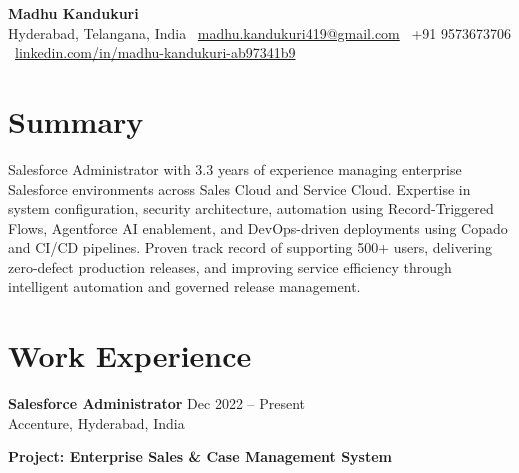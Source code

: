 \documentclass[11pt,a4paper]{article}
\begin{document}
\begin{center}
{\LARGE \textbf{Madhu Kandukuri}}\\[6pt]
Hyderabad, Telangana, India \textbar\ 
\href{mailto:madhu.kandukuri419@gmail.com}{madhu.kandukuri419@gmail.com} \textbar\ 
+91 9573673706 \textbar\ 
\href{https://www.linkedin.com/in/madhu-kandukuri-ab97341b9/}{linkedin.com/in/madhu-kandukuri-ab97341b9}
\end{center}

\section*{Summary}

Salesforce Administrator with 3.3 years of experience managing enterprise Salesforce environments across Sales Cloud and Service Cloud. Expertise in system configuration, security architecture, automation using Record-Triggered Flows, Agentforce AI enablement, and DevOps-driven deployments using Copado and CI/CD pipelines. Proven track record of supporting 500+ users, delivering zero-defect production releases, and improving service efficiency through intelligent automation and governed release management.

\section*{Work Experience}

\textbf{Salesforce Administrator} \hfill Dec 2022 -- Present\\
Accenture, Hyderabad, India

\textbf{Project: Enterprise Sales \& Case Management System}
\end{document}
